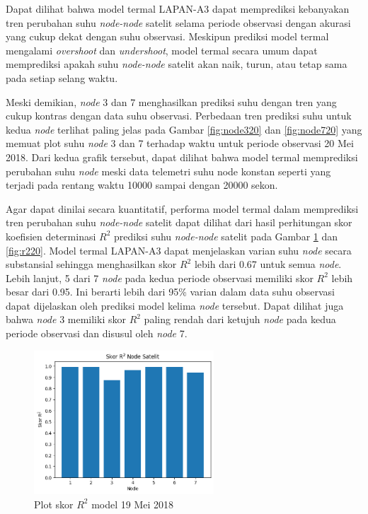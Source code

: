 Dapat dilihat bahwa model termal LAPAN-A3 dapat memprediksi kebanyakan tren
perubahan suhu \textit{node-node} satelit selama periode observasi dengan akurasi yang
cukup dekat dengan suhu observasi. Meskipun prediksi model termal mengalami
\textit{overshoot} dan \textit{undershoot}, model termal secara umum dapat
memprediksi apakah suhu \textit{node-node} satelit akan naik, turun, atau tetap sama
pada setiap selang waktu.

Meski demikian, \textit{node} 3 dan 7 menghasilkan prediksi suhu
dengan tren yang cukup kontras dengan data suhu observasi. Perbedaan tren
prediksi suhu untuk kedua \textit{node} terlihat paling jelas pada Gambar \ref{fig:node320}
dan \ref{fig:node720} yang memuat plot suhu \textit{node} 3 dan 7 terhadap waktu untuk
periode observasi 20 Mei 2018. Dari kedua grafik tersebut, dapat dilihat bahwa
model termal memprediksi perubahan suhu \textit{node} meski data telemetri suhu node
konstan seperti yang terjadi pada rentang waktu 10000 sampai dengan 20000
sekon.

Agar dapat dinilai secara kuantitatif, performa model termal dalam memprediksi
tren perubahan suhu \textit{node-node} satelit dapat dilihat dari hasil
perhitungan skor koefisien determinasi $R^2$ prediksi suhu \textit{node-node}
satelit pada Gambar \ref{fig:r219} dan \ref{fig:r220}. Model termal LAPAN-A3
dapat menjelaskan varian suhu \textit{node} secara substansial sehingga
menghasilkan skor $R^2$ lebih dari 0.67 untuk semua \textit{node}. Lebih
lanjut, 5 dari 7 \textit{node} pada kedua periode observasi memiliki skor $R^2$
lebih besar dari 0.95. Ini berarti lebih dari 95\% varian dalam data suhu
observasi dapat dijelaskan oleh prediksi model kelima \textit{node} tersebut.
Dapat dilihat juga bahwa \textit{node} 3 memiliki skor $R^2$ paling rendah dari
ketujuh \textit{node} pada kedua periode observasi dan disusul oleh
\textit{node} 7.

\begin{figure}[H]
\setlength{}
\begin{center}
\includegraphics[width=0.6\textwidth]{fig/r2_2018-05-19.png}
\caption{Plot skor $R^2$ model 19 Mei 2018}
\label{fig:r219}
\end{center}
\end{figure}

